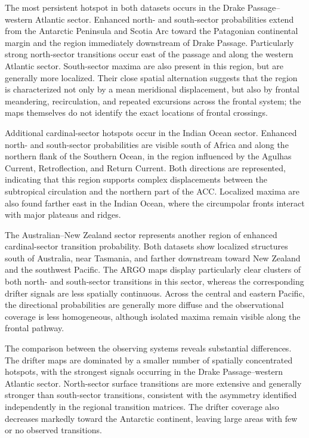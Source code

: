 \documentclass[
  draft
]{agujournal2025}
\begin{document}
                The most persistent hotspot in both datasets occurs in the Drake Passage--western Atlantic sector. Enhanced north- and south-sector probabilities extend from the Antarctic Peninsula and Scotia Arc toward the Patagonian continental margin and the region immediately downstream of Drake Passage. Particularly strong north-sector transitions occur east of the passage and along the western Atlantic sector. South-sector maxima are also present in this region, but are generally more localized. Their close spatial alternation suggests that the region is characterized not only by a mean meridional displacement, but also by frontal meandering, recirculation, and repeated excursions across the frontal system; the maps themselves do not identify the exact locations of frontal crossings.

                Additional cardinal-sector hotspots occur in the Indian Ocean sector. Enhanced north- and south-sector probabilities are visible south of Africa and along the northern flank of the Southern Ocean, in the region influenced by the Agulhas Current, Retroflection, and Return Current. Both directions are represented, indicating that this region supports complex displacements between the subtropical circulation and the northern part of the ACC. Localized maxima are also found farther east in the Indian Ocean, where the circumpolar fronts interact with major plateaus and ridges. 
                
                The Australian--New Zealand sector represents another region of enhanced cardinal-sector transition probability. Both datasets show localized structures south of Australia, near Tasmania, and farther downstream toward New Zealand and the southwest Pacific. The ARGO maps display particularly clear clusters of both north- and south-sector transitions in this sector, whereas the corresponding drifter signals are less spatially continuous. Across the central and eastern Pacific, the directional probabilities are generally more diffuse and the observational coverage is less homogeneous, although isolated maxima remain visible along the frontal pathway.

                The comparison between the observing systems reveals substantial differences. The drifter maps are dominated by a smaller number of spatially concentrated hotspots, with the strongest signals occurring in the Drake Passage--western Atlantic sector. North-sector surface transitions are more extensive and generally stronger than south-sector transitions, consistent with the asymmetry identified independently in the regional transition matrices. The drifter coverage also decreases markedly toward the Antarctic continent, leaving large areas with few or no observed transitions.
\end{document}
